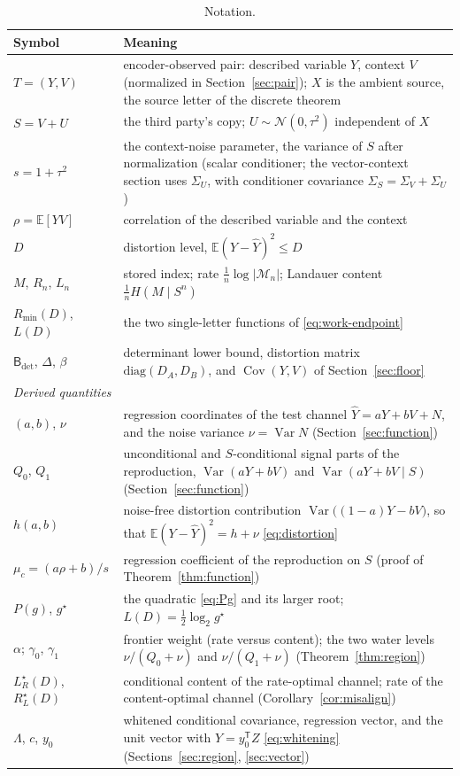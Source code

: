 ﻿\documentclass[11pt,onecolumn]{IEEEtran}
\newcommand{\E}{\mathbb{E}}
\newcommand{\Cov}{\operatorname{Cov}}
\newcommand{\hY}{\widehat{Y}}
\newcommand{\Bdet}{\mathsf{B}_{\det}}
\newcommand{\LRs}{L_{R}^{\star}}
\newcommand{\RLs}{R_{L}^{\star}}
\begin{document}
\begin{table}[!t]
\caption{Notation.}
\label{tab:notation}
\centering
\footnotesize
\begin{tabular}{p{1.35in}p{4.55in}}
\hline
Symbol & Meaning\\
\hline
$T=(Y,V)$ & encoder-observed pair: described variable $Y$, context $V$
(normalized in Section~\ref{sec:pair}); $X$ is the ambient source, the
source letter of the discrete theorem\\
$S=V+U$ & the third party's copy; $U\sim\mathcal N(0,\tau^2)$
independent of $X$\\
$s=1+\tau^2$ & the context-noise parameter, the variance of $S$ after
normalization (scalar conditioner;
the vector-context section uses $\Sigma_U$, with conditioner covariance
$\Sigma_S=\Sigma_V+\Sigma_U$)\\
$\rho=\E[YV]$ & correlation of the described variable and the context\\
$D$ & distortion level, $\E(Y-\hY)^2\le D$\\
$M$, $R_n$, $L_n$ & stored index; rate $\tfrac1n\log|\mathcal M_n|$;
Landauer content $\tfrac1n H(M\mid S^n)$\\
$R_{\min}(D)$, $L(D)$ & the two single-letter functions of
\eqref{eq:work-endpoint}\\
$\Bdet$, $\Delta$, $\beta$ & determinant lower bound, distortion matrix
$\mathrm{diag}(D_A,D_B)$, and $\Cov(Y,V)$ of Section~\ref{sec:floor}\\
\hline
\multicolumn{2}{l}{\emph{Derived quantities}}\\
\hline
$(a,b)$, $\nu$ & regression coordinates of the test channel
$\hY=aY+bV+N$, and the noise variance $\nu=\operatorname{Var}N$
(Section~\ref{sec:function})\\
$Q_0$, $Q_1$ & unconditional and $S$-conditional signal parts of the
reproduction, $\operatorname{Var}(aY+bV)$ and
$\operatorname{Var}(aY+bV\mid S)$ (Section~\ref{sec:function})\\
$h(a,b)$ & noise-free distortion contribution
$\operatorname{Var}\bigl((1-a)Y-bV\bigr)$, so that
$\E(Y-\hY)^2=h+\nu$ \eqref{eq:distortion}\\
$\mu_c=(a\rho+b)/s$ & regression coefficient of the reproduction on
$S$ (proof of Theorem~\ref{thm:function})\\
$P(g)$, $g^\star$ & the quadratic \eqref{eq:Pg} and its larger root;
$L(D)=\tfrac12\log_2 g^\star$\\
$\alpha$; $\gamma_0$, $\gamma_1$ & frontier weight (rate versus
content); the two water levels $\nu/(Q_0+\nu)$ and $\nu/(Q_1+\nu)$
(Theorem~\ref{thm:region})\\
$\LRs(D)$, $\RLs(D)$ & conditional content of the rate-optimal channel;
rate of the content-optimal channel (Corollary~\ref{cor:misalign})\\
$\Lambda$, $c$, $y_0$ & whitened conditional covariance, regression
vector, and the unit vector with $Y=y_0^{\mathsf T}Z$
\eqref{eq:whitening} (Sections~\ref{sec:region}, \ref{sec:vector})\\
\hline
\end{tabular}
\end{table}
\end{document}
